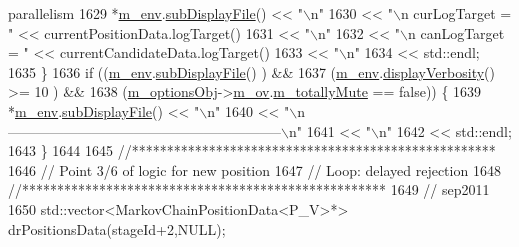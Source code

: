 \begin{DoxyCode}
{       parallelism}
1629       *\hyperlink{class_q_u_e_s_o_1_1_metropolis_hastings_s_g_ac8ea061e55b920e0c8f9bce5c3f20e52}{m\_env}.\hyperlink{class_q_u_e_s_o_1_1_base_environment_a8a0064746ae8dddfece4229b9ad374d6}{subDisplayFile}() << \textcolor{stringliteral}{"\(\backslash\)n"}
1630                               << \textcolor{stringliteral}{"\(\backslash\)n curLogTarget  = "}           << currentPositionData.logTarget()
1631                               << \textcolor{stringliteral}{"\(\backslash\)n"}
1632                               << \textcolor{stringliteral}{"\(\backslash\)n canLogTarget  = "}           << currentCandidateData.logTarget()
1633                               << \textcolor{stringliteral}{"\(\backslash\)n"}
1634                               << std::endl;
1635     \}
1636     \textcolor{keywordflow}{if} ((\hyperlink{class_q_u_e_s_o_1_1_metropolis_hastings_s_g_ac8ea061e55b920e0c8f9bce5c3f20e52}{m\_env}.\hyperlink{class_q_u_e_s_o_1_1_base_environment_a8a0064746ae8dddfece4229b9ad374d6}{subDisplayFile}()                   ) &&
1637         (\hyperlink{class_q_u_e_s_o_1_1_metropolis_hastings_s_g_ac8ea061e55b920e0c8f9bce5c3f20e52}{m\_env}.\hyperlink{class_q_u_e_s_o_1_1_base_environment_a1fe5f244fc0316a0ab3e37463f108b96}{displayVerbosity}() >= 10           ) &&
1638         (\hyperlink{class_q_u_e_s_o_1_1_metropolis_hastings_s_g_a5d0bc9f73d50d272aa6bfb5ef5939ef3}{m\_optionsObj}->\hyperlink{class_q_u_e_s_o_1_1_metropolis_hastings_s_g_options_a9d4792d9fc2dc5439b8ab489b0c236eb}{m\_ov}.\hyperlink{class_q_u_e_s_o_1_1_mh_options_values_af812309e81191e88dfdc87c5815141a3}{m\_totallyMute} == \textcolor{keyword}{false})) \{
1639       *\hyperlink{class_q_u_e_s_o_1_1_metropolis_hastings_s_g_ac8ea061e55b920e0c8f9bce5c3f20e52}{m\_env}.\hyperlink{class_q_u_e_s_o_1_1_base_environment_a8a0064746ae8dddfece4229b9ad374d6}{subDisplayFile}() << \textcolor{stringliteral}{"\(\backslash\)n"}
1640                               << \textcolor{stringliteral}{"\(\backslash\)n-----------------------------------------------------------\(\backslash\)n"}
1641                               << \textcolor{stringliteral}{"\(\backslash\)n"}
1642                               << std::endl;
1643     \}
1644 
1645     \textcolor{comment}{//****************************************************}
1646     \textcolor{comment}{// Point 3/6 of logic for new position}
1647     \textcolor{comment}{// Loop: delayed rejection}
1648     \textcolor{comment}{//****************************************************}
1649     \textcolor{comment}{// sep2011}
1650     std::vector<MarkovChainPositionData<P\_V>*> drPositionsData(stageId+2,NULL);

\end{DoxyCode}
